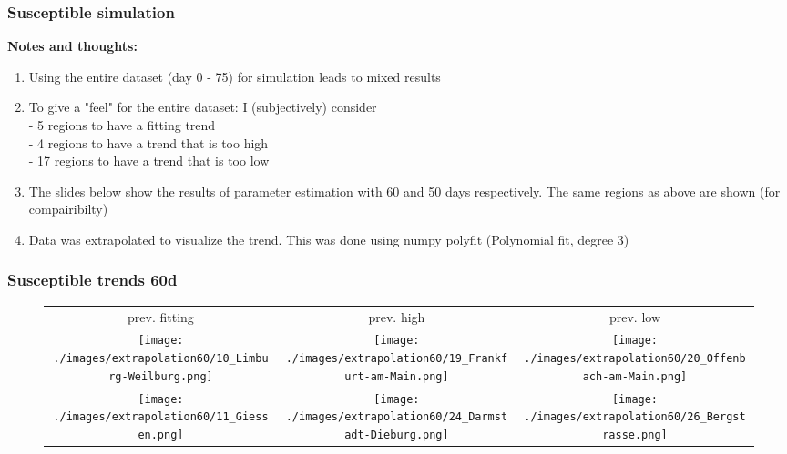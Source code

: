 \documentclass{beamer}
\begin{document}
\begin{frame}
	\frametitle{Susceptible simulation}
	\textbf{Notes and thoughts:}
	\begin{enumerate}[$\bullet$]
		\item Using the entire dataset (day 0 - 75) for simulation leads to mixed results
		\item To give a "feel" for the entire dataset: I (subjectively) consider\\
			- 5 regions to have a fitting trend\\
			- 4 regions to have  a trend that is too high\\
			- 17 regions to have a trend that is too low
		\item The slides below show the results of parameter estimation with 60 and 50 days respectively. The same regions as above are shown (for compairibilty)
		\item Data was extrapolated to visualize the trend. This was done using numpy polyfit (Polynomial fit, degree 3)
	\end{enumerate}
\end{frame}

\begin{frame}
	\frametitle{Susceptible trends 60d}
	\begin{center}
		\begin{figure}
			\begin{adjustwidth}{-0.8cm}{}
			\begin{tabular}{ccc}
				prev. fitting & prev. high & prev. low \\
				\texttt{[image: ./images/extrapolation60/10\_Limburg-Weilburg.png]}
					& \texttt{[image: ./images/extrapolation60/19\_Frankfurt-am-Main.png]}
					& \texttt{[image: ./images/extrapolation60/20\_Offenbach-am-Main.png]} \\
				\texttt{[image: ./images/extrapolation60/11\_Giessen.png]}
					& \texttt{[image: ./images/extrapolation60/24\_Darmstadt-Dieburg.png]}
					& \texttt{[image: ./images/extrapolation60/26\_Bergstrasse.png]}
			\end{tabular}
			\end{adjustwidth}
		\end{figure}
	\end{center}
\end{frame}
\end{document}

